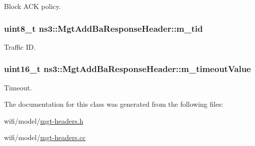 Block A\+CK policy. 

\subsubsection[{\texorpdfstring{m\+\_\+tid}{m_tid}}]{\setlength{\rightskip}{0pt plus 5cm}uint8\+\_\+t ns3\+::\+Mgt\+Add\+Ba\+Response\+Header\+::m\+\_\+tid\hspace{0.3cm}{\ttfamily [private]}}\hypertarget{classns3_1_1MgtAddBaResponseHeader_ab07814fdd0cab095f482656cbe8b20e6}{}\label{classns3_1_1MgtAddBaResponseHeader_ab07814fdd0cab095f482656cbe8b20e6}


Traffic ID. 

\subsubsection[{\texorpdfstring{m\+\_\+timeout\+Value}{m_timeoutValue}}]{\setlength{\rightskip}{0pt plus 5cm}uint16\+\_\+t ns3\+::\+Mgt\+Add\+Ba\+Response\+Header\+::m\+\_\+timeout\+Value\hspace{0.3cm}{\ttfamily [private]}}\hypertarget{classns3_1_1MgtAddBaResponseHeader_a80cf49d04f1ba5fd1f892319ec23c6de}{}\label{classns3_1_1MgtAddBaResponseHeader_a80cf49d04f1ba5fd1f892319ec23c6de}


Timeout. 



The documentation for this class was generated from the following files\+:\begin{DoxyCompactItemize}
\item 
wifi/model/\hyperlink{mgt-headers_8h}{mgt-\/headers.\+h}\item 
wifi/model/\hyperlink{mgt-headers_8cc}{mgt-\/headers.\+cc}\end{DoxyCompactItemize}
